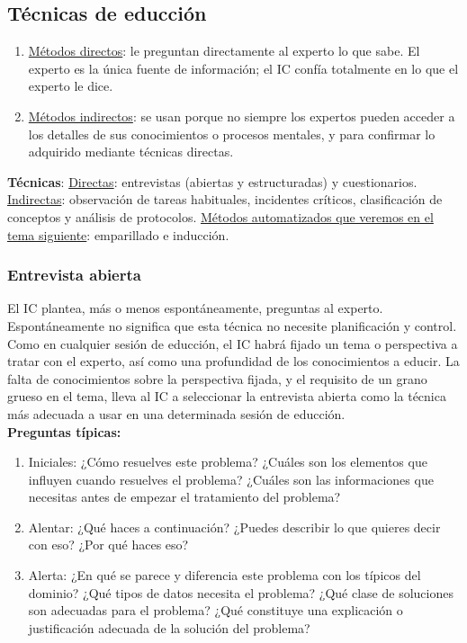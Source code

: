 \documentclass[12pt]{article}
\begin{document}
\subsection{Técnicas de educción}

\begin{enumerate}
\item \underline{Métodos directos}: le preguntan directamente al experto lo que sabe. El experto es la única fuente de información; el IC confía totalmente en lo que el experto le dice.
\item \underline{Métodos indirectos}: se usan porque no siempre los expertos pueden acceder a los detalles de sus conocimientos o procesos mentales, y para confirmar lo adquirido mediante técnicas directas.
\end{enumerate}

\textbf{Técnicas}: \underline{Directas}: entrevistas (abiertas y estructuradas) y cuestionarios. \underline{Indirectas}: observación de tareas habituales, incidentes críticos, clasificación de conceptos y análisis de protocolos. \underline{Métodos automatizados que veremos en el tema siguiente}: emparillado e inducción.\\

\subsubsection{Entrevista abierta}
El IC plantea, más o menos espontáneamente, preguntas al experto. Espontáneamente no significa que esta técnica no necesite planificación y control. Como en cualquier sesión de educción, el IC habrá fijado un tema o perspectiva a tratar con el experto, así como una profundidad de los conocimientos a educir. La falta de conocimientos sobre la perspectiva fijada, y el requisito de un grano grueso en el tema, lleva al IC a seleccionar la entrevista abierta como la técnica más adecuada a usar en una determinada sesión de educción.\\
\textbf{Preguntas típicas:}
\begin{enumerate}
\item Iniciales: ¿Cómo resuelves este problema? ¿Cuáles son los elementos que influyen cuando resuelves el problema? ¿Cuáles son las informaciones que necesitas antes de empezar el tratamiento del problema?
\item Alentar: ¿Qué haces a continuación? ¿Puedes describir lo que quieres decir con eso? ¿Por qué haces eso?
\item Alerta: ¿En qué se parece y diferencia este problema con los típicos del dominio? ¿Qué tipos de datos necesita el problema? ¿Qué clase de soluciones son adecuadas para el problema? ¿Qué constituye una explicación o justificación adecuada de la solución del problema?
\end{enumerate}
\end{document}
